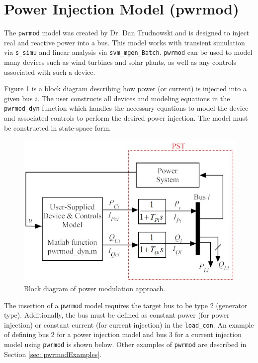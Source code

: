\section{Power Injection Model (pwrmod)}  

The \verb|pwrmod| model was created by Dr. Dan Trudnowski and is designed to inject real and reactive power into a bus.
This model works with transient simulation via \verb|s_simu| and linear analysis via \verb|svm_mgen_Batch|.
\verb|pwrmod| can be used to model many devices such as wind turbines and solar plants, as well as any controls associated with such a device.

Figure \ref{fig: pwrmod BD} is a block diagram describing how power (or current) is injected into a given bus $i$.
The user constructs all devices and modeling equations in the \verb|pwrmod_dyn| function which handles the necessary equations to model the device and associated controls to perform the desired power injection.
The model must be constructed in state-space form.

\begin{figure}[H]
	\centering
	\footnotesize
	\includegraphics[width=.75\linewidth]{sections/pwrmod/BlockDiagram1}
	\caption{Block diagram of power modulation approach.}
	\label{fig: pwrmod BD}
\end{figure}%

The insertion of a \verb|pwrmod| model requires the target bus to be type 2 (generator type).
Additionally, the bus must be defined as constant power (for power injection) or constant current (for current injection) in the \verb|load_con|.
An example of defining bus 2 for a power injection model and bus 3 for a current injection model using \verb|pwrmod| is shown below.
Other examples of \verb|pwrmod| are described in Section \ref{sec: pwrmodExamples}.


